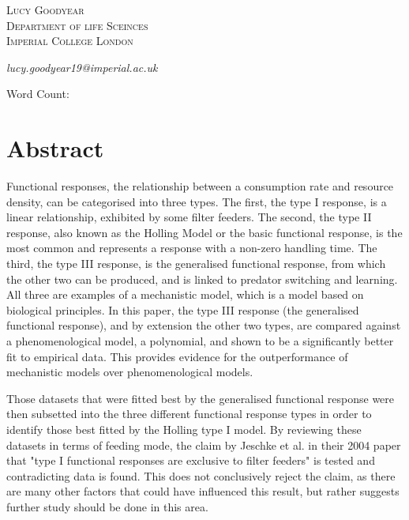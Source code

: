 \documentclass[11pt, a4paper, titlepage]{article}
\newcommand\wordcount{}
\begin{document}
\begin{titlepage}
	
	
	
	\vspace{0.5\baselineskip} %
	
	{\scshape\Large Lucy Goodyear\\
		Department of life Sceinces \\
		Imperial College London\\} %
	
	\textit{lucy.goodyear19@imperial.ac.uk}
	\date{}
	
	\vspace*{3\baselineskip} %
	
	Word Count: \wordcount
	
\end{titlepage}
	
\section*{Abstract}
Functional responses, the relationship between a consumption rate and resource density, can be categorised into three types. The first, the type I response, is a linear relationship, exhibited by some filter feeders. The second, the type II response, also known as the Holling Model or the basic functional response, is the most common and represents a response with a non-zero handling time. The third, the type III response, is the generalised functional response, from which the other two can be produced, and is linked to predator switching and learning. All three are examples of a mechanistic model, which is a model based on biological principles. In this paper, the type III response (the generalised functional response), and by extension the other two types, are compared against a phenomenological model, a polynomial, and shown to be a significantly better fit to empirical data. This provides evidence for the outperformance of mechanistic models over phenomenological models. 

Those datasets that were fitted best by the generalised functional response were then subsetted into the three different functional response types in order to identify those best fitted by the Holling type I model. By reviewing these datasets in terms of feeding mode, the claim by Jeschke et al. in their 2004 paper that "type I functional responses are exclusive to filter feeders" is tested and contradicting data is found. This does not conclusively reject the claim, as there are many other factors that could have influenced this result, but rather suggests further study should be done in this area.
\end{document}
